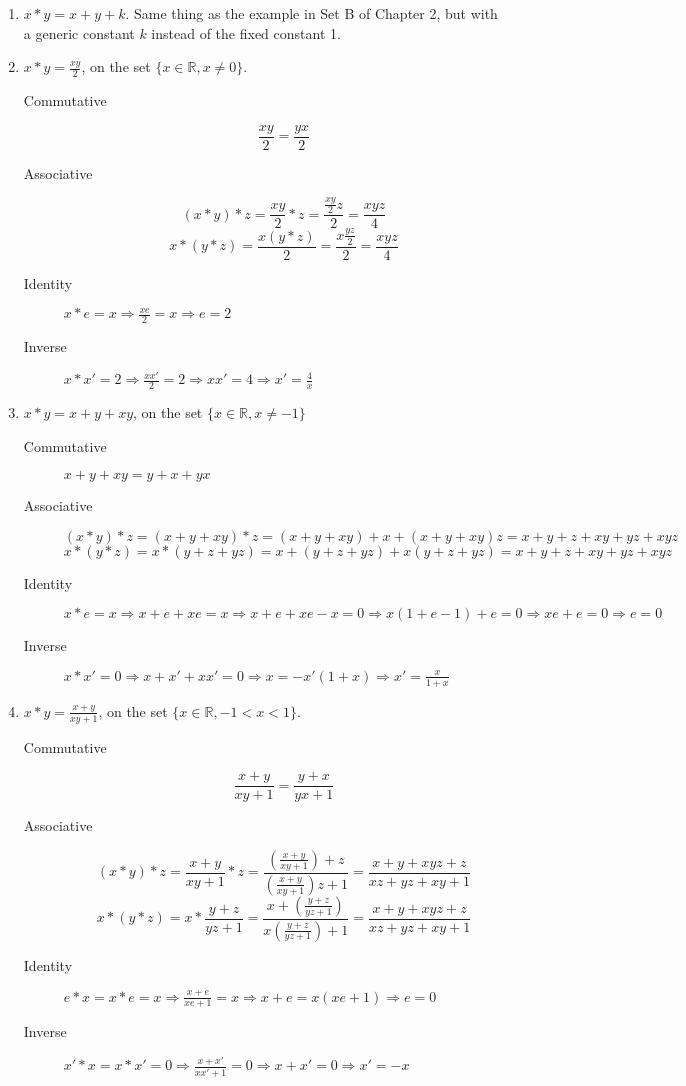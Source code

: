 \documentclass{article}
\begin{document}
\begin{enumerate}
    \item $x * y = x + y + k$. Same thing as the example in Set B of Chapter 2, but with a generic constant $k$ instead of the fixed constant 1.
    \item $x * y = \frac{xy}{2}$, on the set $\{x \in \mathbb{R}, x \ne 0\}$.
    \begin{description}
        \item [Commutative] 
            $$\frac{xy}{2} = \frac{yx}{2}$$
        \item [Associative]
        $$(x * y) * z = \frac{xy}{2} * z = \frac{\frac{xy}{2}z}{2} = \frac{xyz}{4}$$
        $$x * (y * z) = \frac{x(y * z)}{2} = \frac{x\frac{yz}{2}}{2} = \frac{xyz}{4}$$
        \item [Identity] $x * e = x \Rightarrow \frac{xe}{2} = x \Rightarrow e = 2$
        \item [Inverse] $x * x' = 2 \Rightarrow \frac{xx'}{2} = 2 \Rightarrow xx' = 4 \Rightarrow x' = \frac{4}{x}$
    \end{description}
    \item $x * y = x + y + xy$, on the set $\{x \in \mathbb{R}, x \ne -1\}$
    \begin{description}
        \item [Commutative] $x + y + xy = y + x + yx$
        \item [Associative]
        $$(x * y) * z = (x + y + xy) * z = (x + y + xy) + x + (x + y + xy)z = x + y + z + xy + yz + xyz$$
        $$x * (y * z) = x * (y + z + yz) = x + (y + z + yz) + x(y + z + yz) = x + y + z + xy + yz + xyz$$
        \item [Identity] $x * e = x \Rightarrow x + e + xe = x \Rightarrow x + e + xe - x = 0 \Rightarrow x(1 + e - 1) + e = 0 \Rightarrow xe + e = 0 \Rightarrow e = 0$
        \item [Inverse] $x * x' = 0 \Rightarrow x + x'+ xx' = 0 \Rightarrow x = -x'(1 + x) \Rightarrow x' = \frac{x}{1+x}$
    \end{description}
    \item $x * y = \frac{x + y}{xy + 1}$, on the set $\{x \in \mathbb{R}, -1 < x < 1\}$.
    \begin{description}
        \item [Commutative]
            $$\frac{x + y}{xy + 1} = \frac{y + x}{yx + 1}$$
        \item [Associative]
            $$(x * y) * z = \frac{x + y}{xy + 1} * z = \frac{(\frac{x + y}{xy + 1}) + z}{(\frac{x + y}{xy + 1})z + 1} = \frac{x + y + xyz + z}{xz + yz + xy + 1}$$
            $$x * (y * z) = x * \frac{y + z}{yz + 1} = \frac{x + (\frac{y + z}{yz + 1})}{x(\frac{y + z}{yz + 1}) + 1} = \frac{x + y + xyz + z}{xz + yz + xy + 1}$$
        \item [Identity] $e * x = x * e = x \Rightarrow \frac{x + e}{xe + 1} = x \Rightarrow x + e = x(xe + 1) \Rightarrow e = 0$
        \item [Inverse] $x' * x = x * x' = 0 \Rightarrow \frac{x + x'}{xx' + 1} = 0 \Rightarrow x + x' = 0 \Rightarrow x' = -x$
    \end{description}
\end{enumerate}
\end{document}
